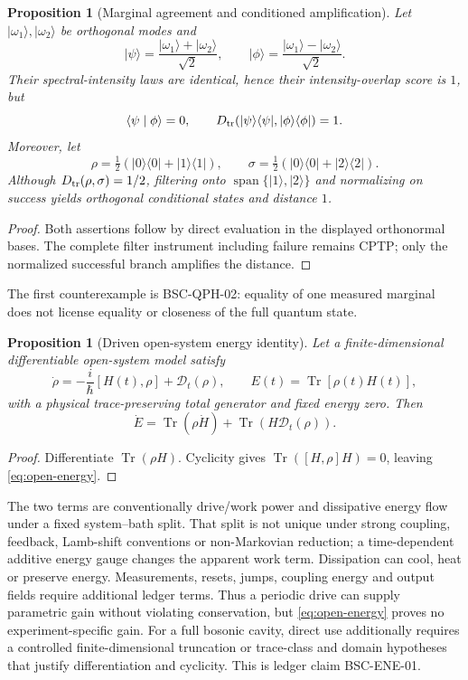 \documentclass[11pt,a4paper]{article}
\theoremstyle{definition}
\theoremstyle{plain}
\newtheorem{proposition}[definition]{Proposition}
\theoremstyle{remark}
\newcommand{\Tr}{\operatorname{Tr}}
\begin{document}
\begin{proposition}[Marginal agreement and conditioned amplification]
\label{prop:qph-boundary}
Let \(\lvert\omega_1\rangle,\lvert\omega_2\rangle\) be orthogonal modes and
\[
\lvert\psi\rangle
=\frac{\lvert\omega_1\rangle+\lvert\omega_2\rangle}{\sqrt2},
\qquad
\lvert\phi\rangle
=\frac{\lvert\omega_1\rangle-\lvert\omega_2\rangle}{\sqrt2}.
\]
Their spectral-intensity laws are identical, hence their intensity-overlap
score is \(1\), but
\[
\langle\psi\mid\phi\rangle=0,
\qquad
D_{\rm tr}
(\lvert\psi\rangle\langle\psi\rvert,
 \lvert\phi\rangle\langle\phi\rvert)=1.
\]
Moreover, let
\[
\rho=\tfrac12
(\lvert0\rangle\langle0\rvert+\lvert1\rangle\langle1\rvert),
\qquad
\sigma=\tfrac12
(\lvert0\rangle\langle0\rvert+\lvert2\rangle\langle2\rvert).
\]
Although \(D_{\rm tr}(\rho,\sigma)=1/2\), filtering onto
\(\operatorname{span}\{\lvert1\rangle,\lvert2\rangle\}\) and normalizing on success yields
orthogonal conditional states and distance \(1\).
\end{proposition}
\begin{proof}
Both assertions follow by direct evaluation in the displayed orthonormal
bases.  The complete filter instrument including failure remains CPTP; only
the normalized successful branch amplifies the distance.
\end{proof}
The first counterexample is BSC-QPH-02: equality of one measured marginal
does not license equality or closeness of the full quantum state.

\begin{proposition}[Driven open-system energy identity]
\label{prop:open-energy}
Let a finite-dimensional differentiable open-system model satisfy
\[
\dot\rho
=-\frac{i}{\hbar}[H(t),\rho]+\mathcal D_t(\rho),
\qquad
E(t)=\Tr[\rho(t)H(t)],
\]
with a physical trace-preserving total generator and fixed energy zero.  Then
\begin{equation}\label{eq:open-energy}
\boxed{
\dot E
=\Tr(\rho\dot H)+\Tr\!\left(H\mathcal D_t(\rho)\right)
}.
\end{equation}
\end{proposition}
\begin{proof}
Differentiate \(\Tr(\rho H)\).  Cyclicity gives
\(\Tr([H,\rho]H)=0\), leaving \eqref{eq:open-energy}.
\end{proof}

The two terms are conventionally drive/work power and dissipative energy flow
under a fixed system--bath split.  That split is not unique under strong
coupling, feedback, Lamb-shift conventions or non-Markovian reduction; a
time-dependent additive energy gauge changes the apparent work term.
Dissipation can cool, heat or preserve energy.  Measurements, resets, jumps,
coupling energy and output fields require additional ledger terms.  Thus a
periodic drive can supply parametric gain without violating conservation, but
\eqref{eq:open-energy} proves no experiment-specific gain.
For a full bosonic cavity, direct use additionally requires a controlled
finite-dimensional truncation or trace-class and domain hypotheses that
justify differentiation and cyclicity.
This is ledger claim BSC-ENE-01.
\end{document}
